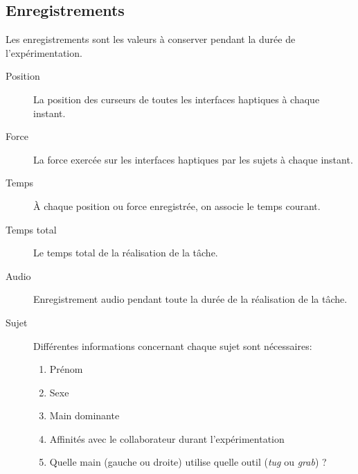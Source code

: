 \documentclass[a4paper,fleqn]{report}
\begin{document}
			\subsection{Enregistrements}
				Les enregistrements sont les valeurs à conserver pendant la durée de l'expérimentation.
				\begin{description}
					\item[Position] La position des curseurs de toutes les interfaces haptiques à chaque instant.
					\item[Force] La force exercée sur les interfaces haptiques par les sujets à chaque instant.
					\item[Temps] À chaque position ou force enregistrée, on associe le temps courant.
					\item[Temps total] Le temps total de la réalisation de la tâche.
					\item[Audio] Enregistrement audio pendant toute la durée de la réalisation de la tâche.
					\item[Sujet] Différentes informations concernant chaque sujet sont nécessaires:
					\begin{enumerate}
						\item Prénom 
						\item Sexe
						\item Main dominante
						\item Affinités avec le collaborateur durant l'expérimentation
						\item Quelle main (gauche ou droite) utilise quelle outil (\emph{tug} ou \emph{grab}) ?
					\end{enumerate}
				\end{description}
				
\end{document}
